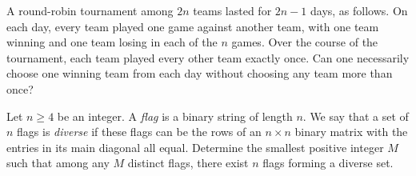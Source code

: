 \documentclass[11pt]{article}
\begin{document}
\begin{problem}
	A round-robin tournament among $2 n$ teams lasted for $2 n-1$ days, as follows. On each day, every team played one game against another team, with one team winning and one team losing in each of the $n$ games. Over the course of the tournament, each team played every other team exactly once. Can one necessarily choose one winning team from each day without choosing any team more than once?
\end{problem}

\begin{problem}
	Let $n \geq 4$ be an integer. A \emph{flag} is a binary string of length $n$. We say that a set of $n$ flags is \emph{diverse} if these flags can be the rows of an $n \times n$ binary matrix with the entries in its main diagonal all equal. Determine the smallest positive integer $M$ such that among any $M$ distinct flags, there exist $n$ flags forming a diverse set.
\end{problem}
\end{document}
